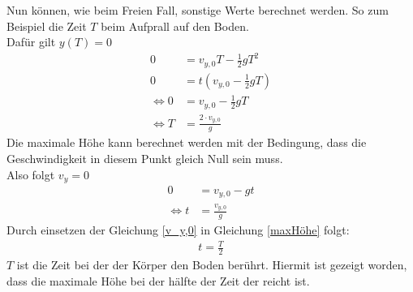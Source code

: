 \documentclass{article}
\begin{document}
Nun können, wie beim Freien Fall, sonstige Werte berechnet werden. So zum Beispiel die Zeit $T$ beim Aufprall auf den Boden.\\
Dafür gilt $y(T)=0$
\begin{align}
    0&=v_{y,0}T-\frac{1}{2}gT^2\\
    0&=t(v_{y,0}-\frac{1}{2}gT)\\
    \Longleftrightarrow 0&=v_{y,0}-\frac{1}{2}gT \label{v_y,0}\\
    \Longleftrightarrow T&=\frac{2\cdot v_{y,0}}{g}
\end{align}
Die maximale Höhe kann berechnet werden mit der Bedingung, dass die Geschwindigkeit in diesem Punkt gleich Null sein muss.\\
Also folgt $v_y=0$
\begin{align}
    0&=v_{y,0}-gt\\
    \Longleftrightarrow t&=\frac{v_{y,0}}{g}\label{maxHöhe}
\end{align}
Durch einsetzen der Gleichung \ref{v_y,0} in Gleichung \ref{maxHöhe} folgt:
\begin{align}
    t=\frac{T}{2}
\end{align}
$T$ ist die Zeit bei der der Körper den Boden berührt. Hiermit ist gezeigt worden, dass die maximale Höhe bei der hälfte der Zeit der reicht ist.\\
\end{document}
